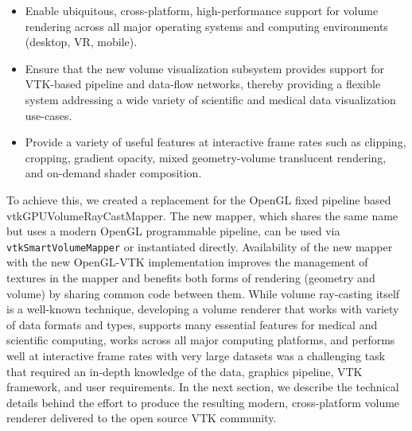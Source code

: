 \begin{itemize}
  \item Enable ubiquitous, cross-platform, high-performance support for volume 
    rendering across all major operating systems and computing environments (desktop, VR, mobile).

  \item Ensure that the new volume visualization subsystem provides support for VTK-based pipeline and data-flow
    networks, thereby providing a flexible system addressing a wide variety of scientific and medical data
    visualization use-cases.

  \item Provide a variety of useful features at interactive frame
    rates such as clipping, cropping, gradient opacity, mixed geometry-volume translucent
    rendering, and on-demand shader composition.
\end{itemize}

To achieve this, we created a replacement for the OpenGL fixed pipeline based
vtkGPUVolumeRayCastMapper. The new mapper, which shares the same name but uses
a modern OpenGL programmable pipeline, can be used via
\texttt{vtkSmartVolumeMapper} or instantiated directly. Availability of the
new mapper with the new OpenGL-VTK implementation improves the management of
textures in the mapper and benefits both forms of rendering (geometry and
volume) by sharing common code between them. While volume ray-casting itself
is a well-known technique, developing a volume renderer that works with
variety of data formats and types, supports many essential features for
medical and scientific computing, works across all major computing platforms,
and performs well at interactive frame rates with very large datasets was a
challenging task that required an in-depth knowledge of the data, graphics
pipeline, VTK framework, and user requirements.  In the next section, we
describe the technical details behind the effort to produce the resulting
modern, cross-platform volume renderer delivered to the open source VTK
community.
